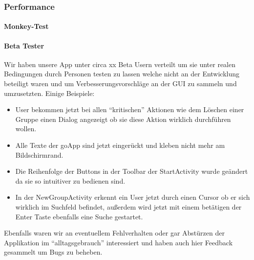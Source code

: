 \documentclass{scrartcl}
\begin{document}
	\subsubsection{Performance}
		\paragraph{Monkey-Test}
		\paragraph{Beta Tester}
		Wir haben unsere App unter circa xx Beta Usern verteilt um sie unter realen Bedingungen durch Personen testen zu lassen welche nicht an der Entwicklung beteiligt waren und um Verbesserungsvorschläge an der GUI zu sammeln und umzusetzten.
		\newline Einige Beispiele:
			\begin{itemize}
				\item User bekommen jetzt bei allen "`kritischen"' Aktionen wie dem Löschen einer Gruppe einen Dialog angezeigt ob sie diese Aktion wirklich durchführen wollen.
				\item Alle Texte der goApp sind jetzt eingerückt und kleben nicht mehr am Bildschirmrand.
				\item Die Reihenfolge der Buttons in der Toolbar der StartActivity wurde geändert da sie so intuitiver zu bedienen sind.
				\item In der NewGroupActivity erkennt ein User jetzt durch einen Cursor ob er sich wirklich im Suchfeld befindet, außerdem wird jetzt mit einem betätigen der Enter Taste ebenfalls eine Suche gestartet.
			\end{itemize}
		
		Ebenfalls waren wir an eventuellem Fehlverhalten oder gar Abstürzen der Applikation im "`alltagsgebrauch"' interessiert und haben auch hier Feedback gesammelt um Bugs zu beheben.
\end{document}
